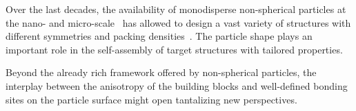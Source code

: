 \documentclass[a4paper,twocolumn]{revtex4}
\begin{document}
Over the last decades, the availability of monodisperse non-spherical particles at the nano- and micro-scale~\cite{Sacanna2011,Vutukuri2014,Miriam2015} has allowed to design a vast variety of structures with different symmetries and packing densities~\cite{DeGraaf2012,Damasceno2012,Schultz2015}. 
The particle shape plays an important role in the self-assembly of target structures with tailored properties. 

Beyond the already rich framework offered by non-spherical particles, the interplay between the anisotropy of the building blocks and well-defined bonding sites on the particle surface might open tantalizing new perspectives. 
\end{document}
